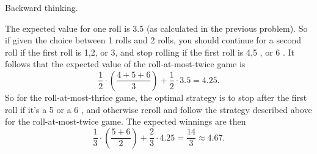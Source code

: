 
\setcounter{theorem}{3}
\begin{exercise} [BH.4.4]
\begin{hint}
    Backward thinking. 
\end{hint}
\begin{solution}
    The expected value for one roll is $3.5$ (as calculated in the previous problem). So if given the choice between 1 rolls and 2 rolls, you should continue for a second roll if the first roll is 1,2, or 3, and stop rolling if the first roll is 4,5 , or 6 . It follows that the expected value of the roll-at-most-twice game is
    $$
    \frac{1}{2} \cdot\left(\frac{4+5+6}{3}\right)+\frac{1}{2} \cdot 3.5=4.25 .
    $$
    So for the roll-at-most-thrice game, the optimal strategy is to stop after the first roll if it's a 5 or a 6 , and otherwise reroll and follow the strategy described above for the roll-at-most-twice game.
    The expected winnings are then
    $$
    \frac{1}{3} \cdot\left(\frac{5+6}{2}\right)+\frac{2}{3} \cdot 4.25=\frac{14}{3} \approx 4.67 .
    $$
\end{solution}
\end{exercise}


